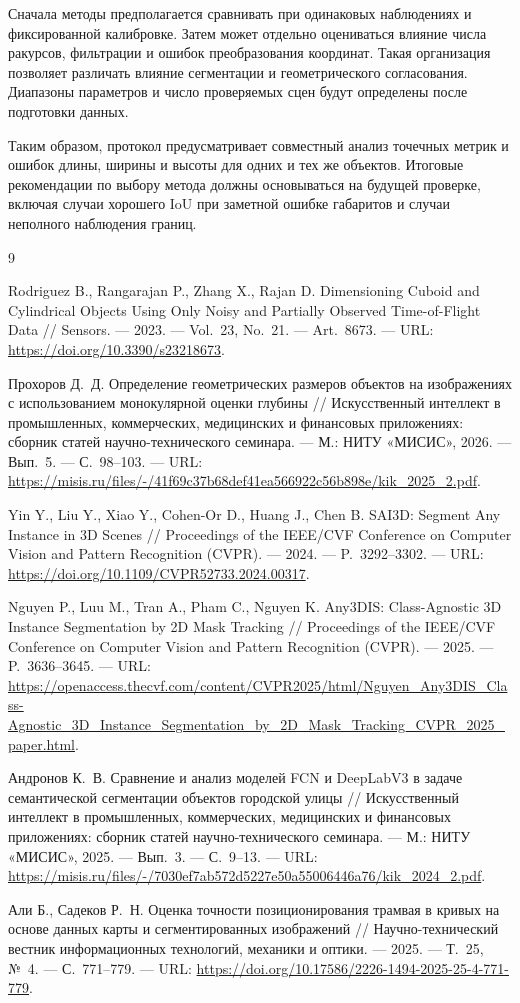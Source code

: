 \documentclass{misisarticle}
\begin{document}
Сначала методы предполагается сравнивать при одинаковых наблюдениях и фиксированной калибровке. Затем может отдельно оцениваться влияние числа ракурсов, фильтрации и ошибок преобразования координат. Такая организация позволяет различать влияние сегментации и геометрического согласования. Диапазоны параметров и число проверяемых сцен будут определены после подготовки данных.

Таким образом, протокол предусматривает совместный анализ точечных метрик и ошибок длины, ширины и высоты для одних и тех же объектов. Итоговые рекомендации по выбору метода должны основываться на будущей проверке, включая случаи хорошего IoU при заметной ошибке габаритов и случаи неполного наблюдения границ.

\begin{thebibliography}{9}

Rodriguez B., Rangarajan P., Zhang X., Rajan D.
Dimensioning Cuboid and Cylindrical Objects Using Only Noisy and Partially Observed Time-of-Flight Data // Sensors. --- 2023. --- Vol.~23, No.~21. --- Art.~8673.
--- URL: \url{https://doi.org/10.3390/s23218673}.

Прохоров Д.~Д. Определение геометрических размеров объектов на изображениях с использованием монокулярной оценки глубины // Искусственный интеллект в промышленных, коммерческих, медицинских и финансовых приложениях: сборник статей научно-технического семинара. --- М.: НИТУ «МИСИС», 2026. --- Вып.~5. --- С.~98--103.
--- URL: \url{https://misis.ru/files/-/41f69c37b68def41ea566922c56b898e/kik_2025_2.pdf}.

Yin Y., Liu Y., Xiao Y., Cohen-Or D., Huang J., Chen B.
SAI3D: Segment Any Instance in 3D Scenes // Proceedings of the IEEE/CVF Conference on Computer Vision and Pattern Recognition (CVPR). --- 2024. --- P.~3292--3302.
--- URL: \url{https://doi.org/10.1109/CVPR52733.2024.00317}.

Nguyen P., Luu M., Tran A., Pham C., Nguyen K.
Any3DIS: Class-Agnostic 3D Instance Segmentation by 2D Mask Tracking // Proceedings of the IEEE/CVF Conference on Computer Vision and Pattern Recognition (CVPR). --- 2025. --- P.~3636--3645.
--- URL: \url{https://openaccess.thecvf.com/content/CVPR2025/html/Nguyen_Any3DIS_Class-Agnostic_3D_Instance_Segmentation_by_2D_Mask_Tracking_CVPR_2025_paper.html}.

Андронов К.~В. Сравнение и анализ моделей FCN и DeepLabV3 в задаче семантической сегментации объектов городской улицы // Искусственный интеллект в промышленных, коммерческих, медицинских и финансовых приложениях: сборник статей научно-технического семинара. --- М.: НИТУ «МИСИС», 2025. --- Вып.~3. --- С.~9--13.
--- URL: \url{https://misis.ru/files/-/7030ef7ab572d5227e50a55006446a76/kik_2024_2.pdf}.

Али Б., Садеков Р.~Н. Оценка точности позиционирования трамвая в кривых на основе данных карты и сегментированных изображений // Научно-технический вестник информационных технологий, механики и оптики. --- 2025. --- Т.~25, №~4. --- С.~771--779.
--- URL: \url{https://doi.org/10.17586/2226-1494-2025-25-4-771-779}.

\end{thebibliography}
\end{document}
